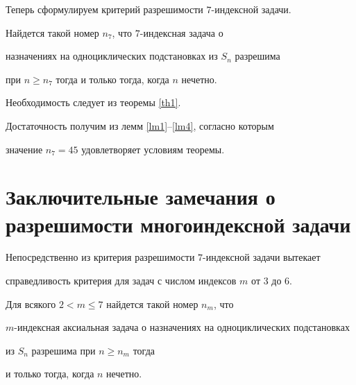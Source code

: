 Теперь сформулируем критерий разрешимости $7$-индексной задачи.





\begin{thm}


\label{th2}


Найдется такой номер $n_7$, что $7$-индексная задача о


назначениях на одноциклических подстановках из $S_n $ разрешима


при $n\ge n_7 $ тогда и только тогда, когда $n$ нечетно.


\end{thm}





\begin{pf}


Необходимость следует из теоремы \ref{th1}.


Достаточность получим из лемм \ref{lm1}--\ref{lm4}, согласно которым


значение $n_7=45$ удовлетворяет условиям теоремы.


\end{pf}





\section{Заключительные замечания о разрешимости многоиндексной задачи}





Непосредственно из критерия разрешимости $7$-индексной задачи вытекает


справедливость критерия для задач с числом индексов $m$ от 3 до 6.





\begin{thm}


\label{th3}


Для всякого $2<m\le 7$ найдется такой номер $n_m$, что


$m$-индексная аксиальная задача о назначениях на одноциклических подстановках


из $S_n$ разрешима при $n\ge n_m$ тогда


и только тогда, когда $n$ нечетно.


\end{thm}





